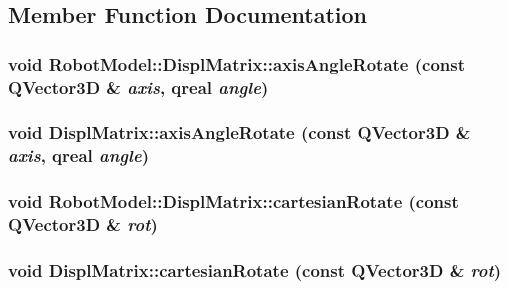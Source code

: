 \subsection{Member Function Documentation}
\hypertarget{class_robot_model_1_1_displ_matrix_ad9e25ad14b7c1638be915464ed74772a}{
\subsubsection[{axisAngleRotate}]{\setlength{\rightskip}{0pt plus 5cm}void RobotModel::DisplMatrix::axisAngleRotate (const QVector3D \& {\em axis}, \/  qreal {\em angle})}}
\label{class_robot_model_1_1_displ_matrix_ad9e25ad14b7c1638be915464ed74772a}
\hypertarget{class_robot_model_1_1_displ_matrix_aaf591b95247e1a80332ba0033427af7e}{
\subsubsection[{axisAngleRotate}]{\setlength{\rightskip}{0pt plus 5cm}void DisplMatrix::axisAngleRotate (const QVector3D \& {\em axis}, \/  qreal {\em angle})}}
\label{class_robot_model_1_1_displ_matrix_aaf591b95247e1a80332ba0033427af7e}
\hypertarget{class_robot_model_1_1_displ_matrix_a45d0a4b0c897dfef441dedff9aa97866}{
\subsubsection[{cartesianRotate}]{\setlength{\rightskip}{0pt plus 5cm}void RobotModel::DisplMatrix::cartesianRotate (const QVector3D \& {\em rot})}}
\label{class_robot_model_1_1_displ_matrix_a45d0a4b0c897dfef441dedff9aa97866}
\hypertarget{class_robot_model_1_1_displ_matrix_a337c49b52435255a7f36966c7047f6ff}{
\subsubsection[{cartesianRotate}]{\setlength{\rightskip}{0pt plus 5cm}void DisplMatrix::cartesianRotate (const QVector3D \& {\em rot})}}
